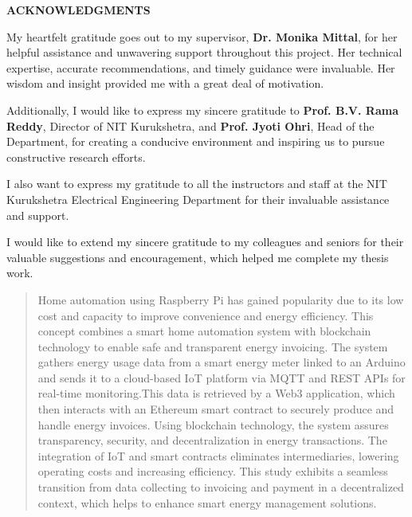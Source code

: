 \documentclass[a4paper,12pt]{report}
\begin{document}
\newpage

\begin{center}
    \textbf{\Large ACKNOWLEDGMENTS}\\
    \hrulefill
\end{center}

\vspace{0.5cm}

My heartfelt gratitude goes out to my supervisor, \textbf{Dr. Monika Mittal}, for her helpful assistance and unwavering support throughout this project. Her technical expertise, accurate recommendations, and timely guidance were invaluable. Her wisdom and insight provided me with a great deal of motivation.  

Additionally, I would like to express my sincere gratitude to \textbf{Prof. B.V. Rama Reddy}, Director of NIT Kurukshetra, and \textbf{Prof. Jyoti Ohri}, Head of the Department, for creating a conducive environment and inspiring us to pursue constructive research efforts.  

I also want to express my gratitude to all the instructors and staff at the NIT Kurukshetra Electrical Engineering Department for their invaluable assistance and support.  

I would like to extend my sincere gratitude to my colleagues and seniors for their valuable suggestions and encouragement, which helped me complete my thesis work.

\begin{abstract}
  Home automation using Raspberry Pi has gained popularity due to its low cost and capacity to improve convenience and energy efficiency.  This concept combines a smart home automation system with blockchain technology to enable safe and transparent energy invoicing.  The system gathers energy usage data from a smart energy meter linked to an Arduino and sends it to a cloud-based IoT platform via MQTT and REST APIs for real-time monitoring.This data is retrieved by a Web3 application, which then interacts with an Ethereum smart contract to securely produce and handle energy invoices.  Using blockchain technology, the system assures transparency, security, and decentralization in energy transactions.  The integration of IoT and smart contracts eliminates intermediaries, lowering operating costs and increasing efficiency.  This study exhibits a seamless transition from data collecting to invoicing and payment in a decentralized context, which helps to enhance smart energy management solutions.


\end{abstract}
\end{document}
